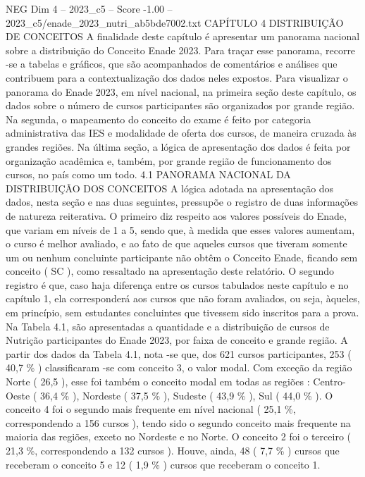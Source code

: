 \begin{textsample}{NEG Dim 4 – 2023\_c5 – Score -1.00 – 2023\_c5/enade\_2023\_nutri\_ab5bde7002.txt}  \label{ex:f4_neg_097}
CAPÍTULO 4 DISTRIBUIÇÃO DE CONCEITOS A finalidade deste capítulo é apresentar um panorama nacional sobre a distribuição do Conceito Enade 2023.
Para traçar esse panorama, recorre -se a tabelas e gráficos, que são acompanhados de comentários e análises que contribuem para a contextualização dos dados neles expostos.
Para visualizar o panorama do Enade 2023, em nível nacional, na primeira seção deste capítulo, os dados sobre o número de cursos participantes são organizados por grande região.
Na segunda, o mapeamento do conceito do exame é feito por categoria administrativa das IES e modalidade de oferta dos cursos, de maneira cruzada às grandes regiões.
Na última seção, a lógica de apresentação dos dados é feita por organização acadêmica e, também, por grande região de funcionamento dos cursos, no país como um todo. 4.1 PANORAMA NACIONAL DA DISTRIBUIÇÃO DOS CONCEITOS A lógica adotada na apresentação dos dados, nesta seção e nas duas seguintes, pressupõe o registro de duas informações de natureza reiterativa.
O primeiro diz respeito aos valores possíveis do Enade, que variam em níveis de 1 a 5, sendo que, à medida que esses valores aumentam, o curso é melhor avaliado, e ao fato de que aqueles cursos que tiveram somente um ou nenhum concluinte participante não obtêm o Conceito Enade, ficando sem conceito ( SC ), como ressaltado na apresentação deste relatório.
O segundo registro é que, caso haja diferença entre os cursos tabulados neste capítulo e no capítulo 1, ela corresponderá aos cursos que não foram avaliados, ou seja, àqueles, em princípio, sem estudantes concluintes que tivessem sido inscritos para a prova.
Na Tabela 4.1, são apresentadas a quantidade e a distribuição de cursos de Nutrição participantes do Enade 2023, por faixa de conceito e grande região.
A partir dos dados da Tabela 4.1, nota -se que, dos 621 cursos participantes, 253 ( 40,7 \% ) classificaram -se com conceito 3, o valor modal.
Com exceção da região Norte ( 26,5 ), esse foi também o conceito modal em todas as regiões : Centro-Oeste ( 36,4 \% ), Nordeste ( 37,5 \% ), Sudeste ( 43,9 \% ), Sul ( 44,0 \% ).
O conceito 4 foi o segundo mais frequente em nível nacional ( 25,1 \%, correspondendo a 156 cursos ), tendo sido o segundo conceito mais frequente na maioria das regiões, exceto no Nordeste e no Norte.
O conceito 2 foi o terceiro ( 21,3 \%, correspondendo a 132 cursos ).
Houve, ainda, 48 ( 7,7 \% ) cursos que receberam o conceito 5 e 12 ( 1,9 \% ) cursos que receberam o conceito 1.

\end{textsample}
